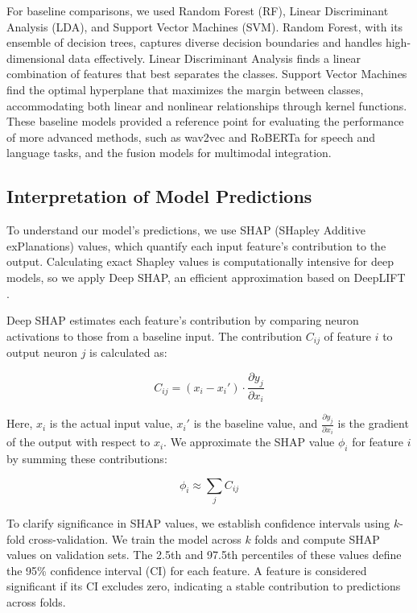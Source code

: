 \documentclass[9pt,a4paper]{rho-class/rho}
\begin{document}
For baseline comparisons, we used Random Forest (RF), Linear Discriminant Analysis (LDA), and Support Vector Machines (SVM). Random Forest, with its ensemble of decision trees, captures diverse decision boundaries and handles high-dimensional data effectively. Linear Discriminant Analysis finds a linear combination of features that best separates the classes. Support Vector Machines find the optimal hyperplane that maximizes the margin between classes, accommodating both linear and nonlinear relationships through kernel functions. These baseline models provided a reference point for evaluating the performance of more advanced methods, such as wav2vec and RoBERTa for speech and language tasks, and the fusion models for multimodal integration.

\subsection{Interpretation of Model Predictions}

To understand our model's predictions, we use SHAP (SHapley Additive exPlanations) values, which quantify each input feature's contribution to the output. Calculating exact Shapley values is computationally intensive for deep models, so we apply Deep SHAP, an efficient approximation based on DeepLIFT \cite{shrikumar2017learning}.

Deep SHAP estimates each feature's contribution by comparing neuron activations to those from a baseline input. The contribution \(C_{ij}\) of feature \(i\) to output neuron \(j\) is calculated as:

\[
C_{ij} = (x_i - x_i') \cdot \frac{\partial y_j}{\partial x_i}
\]

Here, \(x_i\) is the actual input value, \(x_i'\) is the baseline value, and \(\frac{\partial y_j}{\partial x_i}\) is the gradient of the output with respect to \(x_i\). We approximate the SHAP value \(\phi_i\) for feature \(i\) by summing these contributions:

\[
\phi_i \approx \sum_j C_{ij}
\]

To clarify significance in SHAP values, we establish confidence intervals using \( k \)-fold cross-validation. We train the model across \( k \) folds and compute SHAP values on validation sets. The 2.5th and 97.5th percentiles of these values define the 95\% confidence interval (CI) for each feature. A feature is considered significant if its CI excludes zero, indicating a stable contribution to predictions across folds.
\end{document}
